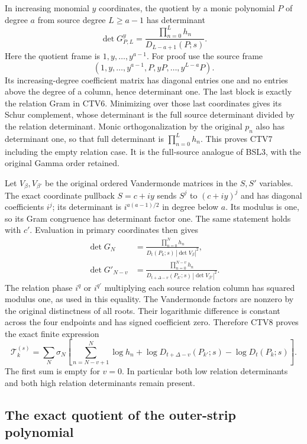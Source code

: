 \documentclass[11pt,a4paper]{article}
\begin{document}
In increasing monomial $y$ coordinates, the quotient by a monic
polynomial $P$ of degree $a$ from source degree $L\ge a-1$
has determinant
\[
 \det G^{y}_{P,L}
   =\frac{\prod_{n=0}^L h_n}{D_{L-a+1}(P;s)} .
 \tag{CTV7}
\]
Here the quotient frame is $1,y,\ldots,y^{a-1}$.
For proof use the source frame
\[(1,y,\ldots,y^{a-1},P,yP,\ldots,y^{L-a}P).\]
Its increasing-degree coefficient matrix has diagonal entries one
and no entries above the degree of a column, hence determinant
one. The last block is exactly the relation Gram in CTV6.
Minimizing over those last coordinates gives its Schur complement,
whose determinant is the full source determinant divided by the
relation determinant. Monic orthogonalization by the original
$p_n$ also has determinant one, so that full determinant is
$\prod_{n=0}^L h_n$. This proves CTV7 including the empty relation
case. It is the full-source analogue of BSL3, with the original
Gamma order retained.

Let $V_\beta,V_{\beta'}$ be the original ordered Vandermonde
matrices in the $S,S'$ variables. The exact coordinate pullback
$S=c+iy$ sends $S^j$ to $(c+iy)^j$ and has diagonal coefficients
$i^j$; its determinant is $i^{a(a-1)/2}$ in degree below $a$.
Its modulus is one, so its Gram congruence has determinant factor
one. The same statement holds with $c'$. Evaluation in primary
coordinates then gives
\[
 \begin{split}
 \det G_N
  &=\frac{\prod_{n=0}^N h_n}
          {D_t(P_k;s)\,|\det V_\beta|^2},\\
 \det G'_{N-v}
  &=\frac{\prod_{n=0}^{N-v}h_n}
     {D_{t+\Delta-v}(P_{k'};s)\,|\det V_{\beta'}|^2}.
 \end{split}\tag{CTV8}
\]
The relation phase $i^q$ or $i^{q'}$ multiplying each source
relation column has squared modulus one, as used in this equality.
The Vandermonde factors are nonzero by the original distinctness
of all roots. Their logarithmic difference is constant across
the four endpoints and has signed coefficient zero. Therefore
CTV8 proves the exact finite expression
\[
 \mathcal T_k^{(s)}
  =\sum_N\sigma_N\left[
      \sum_{n=N-v+1}^{N}\log h_n
      +\log D_{t+\Delta-v}(P_{k'};s)
      -\log D_t(P_k;s)\right].
 \tag{CTV9}
\]
The first sum is empty for $v=0$. In particular both low relation
determinants and both high relation determinants remain present.

\subsection{The exact quotient of the outer-strip polynomial}
\end{document}
